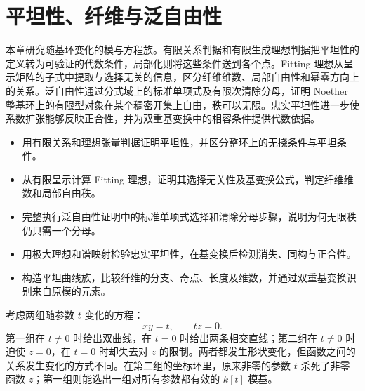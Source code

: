 
% 
% 

\chapter{平坦性、纤维与泛自由性}
\label{g5:ch:06}

\begin{chapterabstract}
	本章研究随基环变化的模与方程族。有限关系判据和有限生成理想判据把平坦性的定义转为可验证的代数条件，局部化则将这些条件送到各个点。Fitting 理想从呈示矩阵的子式中提取与选择无关的信息，区分纤维维数、局部自由性和幂零方向上的关系。泛自由性通过分式域上的标准单项式及有限次清除分母，证明 Noether 整基环上的有限型对象在某个稠密开集上自由，秩可以无限。忠实平坦性进一步使系数扩张能够反映正合性，并为双重基变换中的相容条件提供代数依据。
\end{chapterabstract}

\begin{learninggoals}
	\begin{itemize}
		\item 用有限关系和理想张量判据证明平坦性，并区分整环上的无挠条件与平坦条件。
		\item 从有限呈示计算 Fitting 理想，证明其选择无关性及基变换公式，判定纤维维数和局部自由秩。
		\item 完整执行泛自由性证明中的标准单项式选择和清除分母步骤，说明为何无限秩仍只需一个分母。
		\item 用极大理想和谱映射检验忠实平坦性，在基变换后检测消失、同构与正合性。
		\item 构造平坦曲线族，比较纤维的分支、奇点、长度及维数，并通过双重基变换识别来自原模的元素。
	\end{itemize}
\end{learninggoals}

考虑两组随参数 \(t\) 变化的方程：
\[
	xy=t,\qquad tz=0.
\]
第一组在 \(t\ne0\) 时给出双曲线，在 \(t=0\) 时给出两条相交直线；第二组在 \(t\ne0\) 时迫使 \(z=0\)，在 \(t=0\) 时却失去对 \(z\) 的限制。两者都发生形状变化，但函数之间的关系发生变化的方式不同。在第二组的坐标环里，原来非零的参数 \(t\) 杀死了非零函数 \(z\)；第一组则能选出一组对所有参数都有效的 \(k[t]\) 模基。

